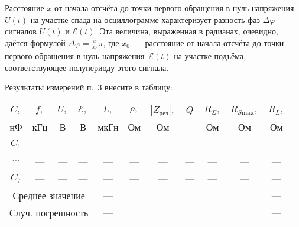 \begin{lab:task}
    Расстояние $x$ от начала отсчёта до точки первого обращения в нуль
напряжения $U(t)$ на участке спада на осциллограмме характеризует разность фаз
$\Delta\varphi$ сигналов $U(t)$ и $\mathcal{E}(t).$ Эта величина, выраженная в
радианах, очевидно, даётся формулой $\Delta\varphi=\frac{x}{x_0}\pi$, где
$x_0$~--- расстояние от начала отсчёта до точки первого обращения в нуль
напряжения~$\mathcal{E}(t)$ на участке подъёма, соответствующее полупериоду
этого сигнала.


	\item Результаты измерений п.~3 внесите в таблицу:\par
\begingroup
\noindent\small \begin{tabular}{|c|c|c|c|c|c|c|c|c|c|c|}
	                \hline
	                $C,$ & $f,$ & $U,$ & $\mathcal{E},$ & $L,$ &
$\rho,$ & $|Z_{\text{рез}}|,$& $Q$ & $R_{\Sigma},$ & $R_{S
\text{max}},$& $R_L,$\\

	                нФ & кГц & В & В & мкГн & Ом & Ом &  & Ом & Ом & Ом \\
	                \hline
	                $C_1$ & --- & --- & --- & --- & --- & --- & --- & --- & --- & --- \\
	                \hline
	                $\cdots$ & --- & --- & --- & --- & --- & --- & --- & ---& --- & --- \\
	                \hline
	                $C_7$& --- & --- & --- & --- & --- & --- & ---& --- &--- &---\\
	                \hline
	                \multicolumn{4}{|c|}{Среднее значение} & --- & & & & & & --- \\
	                \hline
	                \multicolumn{4}{|c|}{Случ. погрешность} & ---& & & & & &---\\
	                \hline
	            \end{tabular}\par
\endgroup


\end{lab:task}
